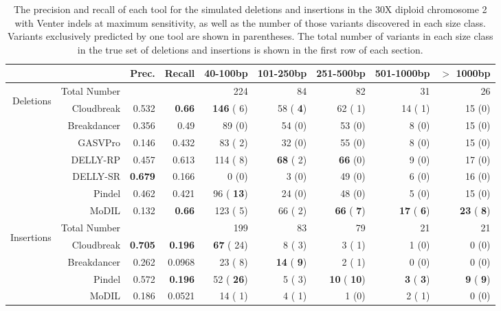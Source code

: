 \documentclass[11pt]{article}
\begin{document}
\begin{table}
\begin{center}
\begin{tabular}{r|rrr|rrrrr}
  \cline{2-9}
   &                     & Prec. & Recall & 40-100bp  & 101-250bp  & 251-500bp & 501-1000bp & $>$ 1000bp \\ 
\hline
\multirow{7}{*}{\begin{sideways}Deletions\end{sideways}} & Total Number &          &           & 224 &  84 & 82 &  31 & 26\\ 
  \hline
\cline{2-9}
&  Cloudbreak    &  0.532 & \textbf{0.66} & \textbf{146} (  6)  &  58 (\textbf{  4}) &   62 (  1) &  14 (  1) &  15 (0) \\ 
&  Breakdancer   &  0.356 & 0.49 &  89 (0)  &  54 (0) &   53 (0) &   8 (0) &  15 (0) \\ 
&  GASVPro        & 0.146 & 0.432 &  83 (  2)  &  32 (0) &   55 (0) &   8 (0) &  15 (0) \\ 
&  DELLY-RP           & 0.457 & 0.613 & 114 (  8)  & \textbf{ 68} (  2) &  \textbf{ 66} (0) &   9 (0) &  17 (0) \\ 
&  DELLY-SR           & \textbf{0.679} & 0.166 & 0 (0)  &   3 (0) &   49 (0) &   6 (0) &  16 (0) \\ 
&  Pindel           & 0.462 & 0.421 &  96 (\textbf{ 13})  &  24 (0) &   48 (0) &   5 (0) &  15 (0)\\ 
&  MoDIL           & 0.132  & \textbf{0.66} & 123 (  5)  &  66 (  2) &  \textbf{ 66} (\textbf{  7}) & \textbf{ 17} (\textbf{  6}) & \textbf{ 23} (\textbf{  8})\\ 
   \hline
\multirow{5}{*}{\begin{sideways}Insertions\end{sideways}} & Total Number &          &           & 199 &  83 & 79 &  21 & 21\\ 
\cline{2-9}
&  Cloudbreak   &\textbf{0.705} & \textbf{0.196}  & \textbf{ 67} ( 24)  &   8 (  3) &    3 (  1) &   1 (0) & 0 (0) \\ 
&  Breakdancer & 0.262 & 0.0968  &  23 (  8)  & \textbf{ 14} (\textbf{  9}) &    2 (  1) & 0 (0) & 0 (0) \\ 
&  Pindel          & 0.572 & \textbf{0.196} &  52 (\textbf{ 26})  &   5 (  3) &  \textbf{ 10} (\textbf{ 10}) & \textbf{  3} (\textbf{  3}) & \textbf{  9} (\textbf{  9})\\ 
&  MoDIL          & 0.186 & 0.0521 &  14 (  1)  &   4 (  1) &    1 (0) &   2 (  1) & 0 (0)\\ 
\hline
\end{tabular}
\end{center}
\caption{The precision and recall of each tool for the simulated deletions and insertions in the 30X diploid chromosome 2 with Venter indels at maximum sensitivity, as well as the number of those variants discovered in each size class. Variants exclusively predicted by one tool are shown in parentheses. The total number of variants in each size class in the true set of deletions and insertions is shown in the first row of each section.}
\label{chr2DeletionAndInsertionPredsMaxSensitivity}
\end{table}
\end{document}

